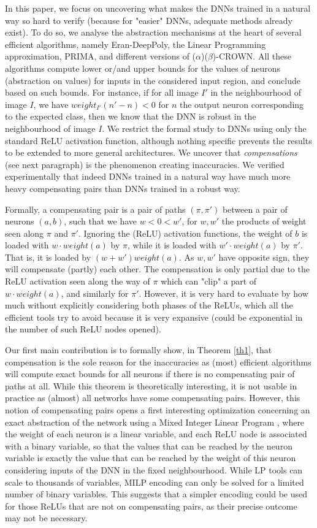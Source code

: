 In this paper, we focus on uncovering what makes the DNNs trained in a natural way so hard to verify (because for "easier" DNNs, adequate methods already exist). To do so, we analyse the abstraction mechanisms at the heart of several efficient algorithms, namely Eran-DeepPoly, the Linear Programming approximation, PRIMA, and different versions of ($\alpha$)($\beta$)-CROWN. All these algorithms compute lower or/and upper bounds for the values of neurons (abstraction on values) for inputs in the considered input region, and conclude based on such bounds. For instance, if for all image $I'$ in the neighbourhood of image $I$, we have $weight_{I'}(n'-n) < 0$ for $n$ the output neuron corresponding to the expected class, then we know that the DNN is robust in the neighbourhood of image $I$. We restrict the formal study to DNNs using only the standard ReLU activation function, although nothing specific prevents the results to be extended to more general architectures. We uncover that {\em compensations} (see next paragraph) is the phenomenon creating inaccuracies. We verified experimentally that indeed DNNs trained in a natural way have much more heavy compensating pairs than DNNs trained in a robust way.

Formally, a compensating pair is a pair of paths $(\pi,\pi')$ between a pair of neurons $(a,b)$, such that we have $w < 0 < w'$, for $w,w'$ the products of weight seen along $\pi$ and $\pi'$. Ignoring the (ReLU) activation functions, the weight of $b$ is loaded with $w \cdot weight(a)$ by $\pi$, while it is loaded with $w' \cdot weight(a)$ by $\pi'$. That is, it is loaded by $(w+w') weight(a)$. As $w,w'$ have opposite sign, they will compensate (partly) each other. The compensation is only partial due to the ReLU activation seen along the way of $\pi$ which can "clip" a part of $w \cdot weight(a)$, and similarly for $\pi'$. However, it is very hard to evaluate by how much without explicitly considering both phases of the ReLUs, which all the efficient tools try to avoid because it is very expansive (could be exponential in the number of such ReLU nodes opened).

Our first main contribution is to formally show, in Theorem \ref{th1}, that compensation is the sole reason for the inaccuracies as (most) efficient algorithms will compute exact bounds for all neurons if there is no compensating pair of paths at all.
While this theorem is theoretically interesting, it is not usable in practice as (almost) all networks have some compensating pairs. However, this notion of compensating pairs opens a first interesting optimization concerning an exact abstraction of the network using a Mixed Integer Linear Program \cite{MILP}, where the weight of each neuron is a linear variable, and each ReLU node is associated with a binary variable, so that the values that can be reached by the neuron variable is exactly the value that can be reached by the weight of this neuron considering inputs of the DNN in the fixed neighbourhood. While LP tools can scale to thousands of variables, MILP encoding can only be solved for a limited number of binary variables. This suggests that a simpler encoding could be used for those ReLUs that are not on compensating pairs, as their precise outcome may not be necessary.

